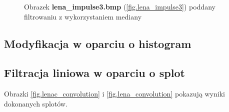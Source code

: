 \documentclass{classrep}
\begin{document}
\begin{figure}
{{  \label{fig.lena_impulse3_median_5x5}
 }
}
\caption{Obrazek \textbf{lena\_impulse3.bmp} (\ref{fig.lena_impulse3}) poddany filtrowaniu z wykorzystaniem mediany}
\label{fig.lena_impulse3_median}
\end{figure}

\subsection{Modyfikacja w oparciu o histogram}

\subsection{Filtracja liniowa w oparciu o splot}
Obrazki \ref{fig.lenac_convolution} i \ref{fig.lena_convolution} pokazują wyniki dokonanych splotów.
\end{document}
